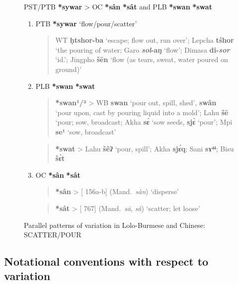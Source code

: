\begin{figure}[h!]
\centering
PST/PTB \textbf{*sywar} > OC \textbf{*sân}  \textbf{*sât} and PLB \textbf{*swan}  \textbf{*swat}
\begin{enumerate}
\item PTB \textbf{*sywar} ‘flow/pour/scatter’
	\begin{quote}
	WT \textbf{ḥtshor-ba} ‘escape; flow out, run over’; Lepcha \textbf{tśhor} ‘the pouring of water; Garo \textbf{\textit{sol}-aŋ}
	‘flow’; Dimasa \textbf{di-\textit{sor}} ‘id.’; Jingpho \textbf{šēn} ‘flow (as tears, sweat, water poured on ground)’
	\end{quote}
\item PLB \textbf{*swan}  \textbf{*swat}
	\begin{quote}
	\textbf{*swan¹/²}  > WB \textbf{swan} ‘pour out, spill, shed’, \textbf{swân} ‘pour upon, cast by pouring liquid into a
	mold’; Lahu \textbf{šē} ‘pour; sow, broadcast; Akha \textbf{sɛ̀} ‘sow seeds, \textbf{sjɛ̀} ‘pour’; Mpi \textbf{se¹} ‘sow, broadcast’
	\end{quote}

	\begin{quote}
	\textbf{*swat} > Lahu \textbf{šêʔ} ‘pour, spill’; Akha \textbf{sjɛ́q}; Sani \textbf{sɤ⁴⁴}; Bisu \textbf{šɛ̀t}
	\end{quote}
\item OC \textbf{*sân}  \textbf{*sât}
	\begin{quote}
	\textbf{*sân} >  [\textit{} 156a-b] (Mand.\ \textit{sàn}) ‘disperse’
	\end{quote}
	\begin{quote}
	\textbf{*sât} >  [\textit{} 767] (Mand.\ \textit{sā}, \textit{sǎ}) ‘scatter; let loose’
	\end{quote}
\end{enumerate}
\caption{Parallel patterns of variation in Lolo-Burmese and Chinese: SCATTER/POUR}
\label{fig:scatter_pour}
\end{figure}

\subsection{Notational conventions with respect to variation}

